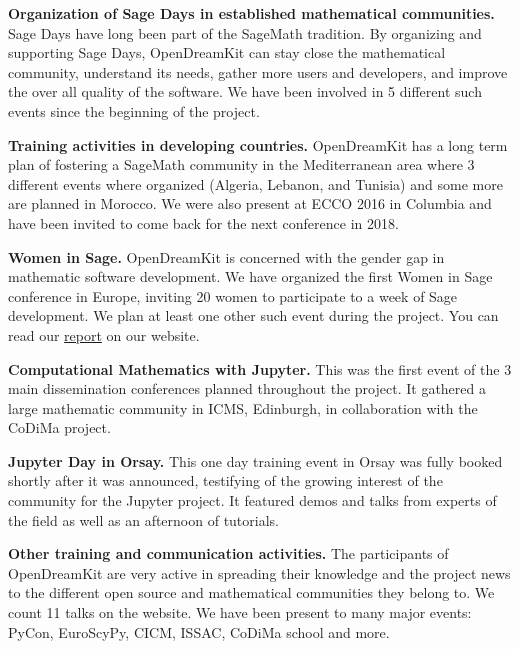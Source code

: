 \documentclass{deliverablereport}
\begin{document}
\begin{compactitem}
\item \textbf{Organization of Sage Days in established mathematical communities.} Sage Days have long been
part of the SageMath tradition. By organizing and supporting Sage Days, OpenDreamKit can stay close
the mathematical community, understand its needs, gather more users and developers, and improve
the over all quality of the software. We have been involved in 5 different such events since the beginning 
of the project.
\item \textbf{Training activities in developing countries.} OpenDreamKit has a long term plan of fostering
a SageMath community in the Mediterranean area where 3 different events where organized (Algeria, Lebanon, and Tunisia) 
and some more are planned in Morocco. We were also present at ECCO 2016 in Columbia and have been invited
to come back for the next conference in 2018. 
\item \textbf{Women in Sage.} OpenDreamKit is concerned with the gender gap in mathematic software development. 
We have organized the first Women in Sage conference in Europe, inviting 20 women to participate to a week of Sage development. We plan at least one other such event during the project. You can read our \href{http://opendreamkit.org/2017/04/06/WomenInSage/}{report} on our website.
\item \textbf{Computational Mathematics with Jupyter.} This was the first event of the 3 main dissemination conferences
planned throughout the project. It gathered a large mathematic community in ICMS, Edinburgh, in collaboration with the CoDiMa project.
\item \textbf{Jupyter Day in Orsay.} This one day training event in Orsay was fully booked shortly after it was announced, testifying of the growing interest of the community for the Jupyter project. It featured demos and talks from experts of the field as well as an afternoon of tutorials. 
\item \textbf{Other training and communication activities.} The participants of OpenDreamKit are very active
in spreading their knowledge and the project news to the different open source
and mathematical communities they belong to. We count 11 talks on the
website. We have been present to many major events: PyCon, EuroScyPy, CICM, ISSAC, CoDiMa school and more. 
\end{compactitem}

\paragraph{}
\end{document}
